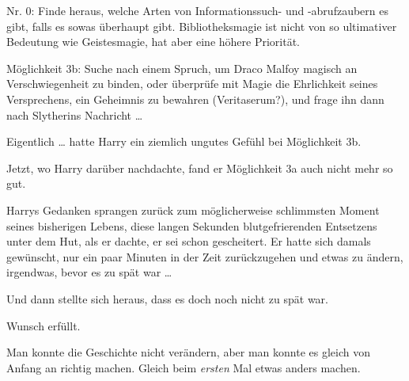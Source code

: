 \begin{em}
Nr. 0: Finde heraus, welche Arten von Informationssuch- und -abrufzaubern es gibt, falls es sowas überhaupt gibt. Bibliotheksmagie ist nicht von so ultimativer Bedeutung wie Geistesmagie, hat aber eine höhere Priorität.

Möglichkeit 3b: Suche nach einem Spruch, um Draco Malfoy magisch an Verschwiegenheit zu binden, oder überprüfe mit Magie die Ehrlichkeit seines Versprechens, ein Geheimnis zu bewahren (Veritaserum?), und frage ihn dann nach Slytherins Nachricht …
\end{em}

Eigentlich … hatte Harry ein ziemlich ungutes Gefühl bei Möglichkeit 3b.

Jetzt, wo Harry darüber nachdachte, fand er Möglichkeit 3a auch nicht mehr so gut.

Harrys Gedanken sprangen zurück zum möglicherweise schlimmsten Moment seines bisherigen Lebens, diese langen Sekunden blutgefrierenden Entsetzens unter dem Hut, als er dachte, er sei schon gescheitert. Er hatte sich damals gewünscht, nur ein paar Minuten in der Zeit zurückzugehen und etwas zu ändern, irgendwas, bevor es zu spät war …

Und dann stellte sich heraus, dass es doch noch nicht zu spät war.

Wunsch erfüllt.

Man konnte die Geschichte nicht verändern, aber man konnte es gleich von Anfang an richtig machen. Gleich beim \emph{ersten} Mal etwas anders machen.

